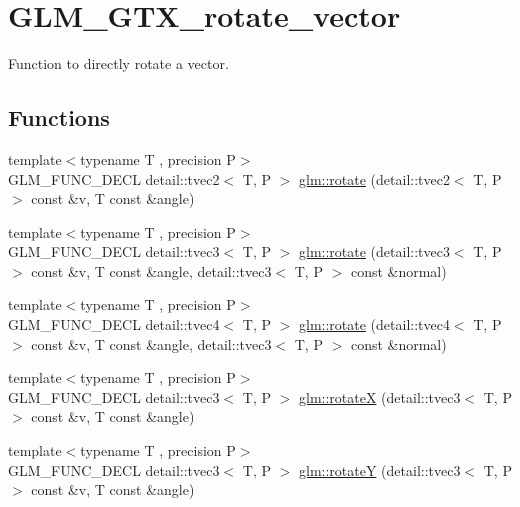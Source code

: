 \hypertarget{group__gtx__rotate__vector}{\section{G\-L\-M\-\_\-\-G\-T\-X\-\_\-rotate\-\_\-vector}
\label{group__gtx__rotate__vector}
}


Function to directly rotate a vector.  


\subsection*{Functions}
\begin{DoxyCompactItemize}
\item 
{\footnotesize template$<$typename T , precision P$>$ }\\G\-L\-M\-\_\-\-F\-U\-N\-C\-\_\-\-D\-E\-C\-L detail\-::tvec2$<$ T, P $>$ \hyperlink{group__gtx__rotate__vector_ga5520f6dd671807ec62a8f97c00c1b78b}{glm\-::rotate} (detail\-::tvec2$<$ T, P $>$ const \&v, T const \&angle)
\item 
{\footnotesize template$<$typename T , precision P$>$ }\\G\-L\-M\-\_\-\-F\-U\-N\-C\-\_\-\-D\-E\-C\-L detail\-::tvec3$<$ T, P $>$ \hyperlink{group__gtx__rotate__vector_ga4eccdf3769ce3b5d1e4018394290f88c}{glm\-::rotate} (detail\-::tvec3$<$ T, P $>$ const \&v, T const \&angle, detail\-::tvec3$<$ T, P $>$ const \&normal)
\item 
{\footnotesize template$<$typename T , precision P$>$ }\\G\-L\-M\-\_\-\-F\-U\-N\-C\-\_\-\-D\-E\-C\-L detail\-::tvec4$<$ T, P $>$ \hyperlink{group__gtx__rotate__vector_gac4abb6be47bd14303d6eded41f2f65f1}{glm\-::rotate} (detail\-::tvec4$<$ T, P $>$ const \&v, T const \&angle, detail\-::tvec3$<$ T, P $>$ const \&normal)
\item 
{\footnotesize template$<$typename T , precision P$>$ }\\G\-L\-M\-\_\-\-F\-U\-N\-C\-\_\-\-D\-E\-C\-L detail\-::tvec3$<$ T, P $>$ \hyperlink{group__gtx__rotate__vector_gadb69cdc8ea08715c9d8a74f587cf0eac}{glm\-::rotate\-X} (detail\-::tvec3$<$ T, P $>$ const \&v, T const \&angle)
\item 
{\footnotesize template$<$typename T , precision P$>$ }\\G\-L\-M\-\_\-\-F\-U\-N\-C\-\_\-\-D\-E\-C\-L detail\-::tvec3$<$ T, P $>$ \hyperlink{group__gtx__rotate__vector_gae1e673b7a464218ce6a5e8f02145f877}{glm\-::rotate\-Y} (detail\-::tvec3$<$ T, P $>$ const \&v, T const \&angle)

\end{DoxyCompactItemize}

